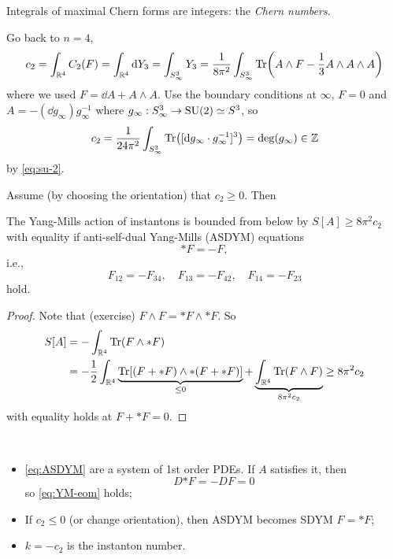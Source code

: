 \documentclass[a4paper,11pt]{article}
\begin{document}
    Integrals of maximal Chern forms are integers: the \emph{Chern numbers}.

    Go back to $n=4$, 
    \begin{equation}
        c_2 = \int_{\mathbb{R}^4} C_2(F) = \int_{\mathbb{R}^4} \dd{Y_3} = \int_{S^3_{\infty}} Y_3 = \frac{1}{8 \pi^2}\int_{S^3_{\infty}} \Tr(A \wedge F - \frac{1}{3} A \wedge A \wedge A)
    \end{equation}
    where we used $F = \dd{A} + A \wedge A$. Use the boundary conditions at $\infty$, $F=0$ and $A = - (\dd{g_{\infty}}) g_{\infty}^{-1}$ where $g_{\infty} : S^3_\infty \to \operatorname{SU}(2) \simeq S^3$, so 
    \begin{equation}
        c_2 = \frac{1}{24 \pi^2} \int_{S^3_\infty} \Tr([\dd{g_\infty} \cdot g_{\infty}^{-1}]^3) = \deg(g_\infty) \in \mathbb{Z}
    \end{equation} 
    by \eqref{eq:su-2}.

    Assume (by choosing the orientation) that $c_2 \geq 0$. Then 
    \begin{thm}
        The Yang-Mills action of instantons is bounded from below by $S[A] \geq 8 \pi^2 c_2$ with equality if anti-self-dual Yang-Mills (ASDYM) equations 
        \begin{equation}
            *F = - F, \label{eq:ASDYM}
        \end{equation}
        i.e.,
        \begin{equation}
            F_{12} = - F_{34}, \quad F_{13} = - F_{42}, \quad F_{14} = - F_{23} 
        \end{equation}
        hold.
    \end{thm}
    \begin{proof}
        Note that (exercise) $F \wedge F = *F \wedge *F$. So 
        \begin{equation}
            \begin{split}
                S[A] & = -\int_{\mathbb{R}^4} \Tr(F \wedge *F)\\
                & = - \frac{1}{2} \int_{\mathbb{R}^4} \underbrace{\Tr[(F + *F) \wedge *(F + *F)]}_{\leq 0} + \underbrace{\int_{\mathbb{R}^4} \Tr(F \wedge F)}_{8 \pi^2 c_2} \geq 8 \pi^2 c_2 
            \end{split}
        \end{equation}
        with equality holds at $F + *F = 0$.
    \end{proof}
    \begin{rmk}
        ~ \begin{itemize}
            \item \eqref{eq:ASDYM} are a system of 1st order PDEs. If $A$ satisfies it, then \begin{equation}
                D {*F} = - D F = 0
            \end{equation}
            so \eqref{eq:YM-eom} holds;
            \item If $c_2 \leq 0$ (or change orientation), then ASDYM becomes SDYM $F = *F$;
            \item $k = -c_2$ is the instanton number.
        \end{itemize}
    \end{rmk}
\end{document}
